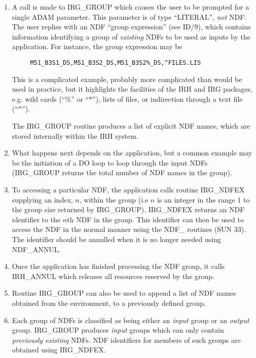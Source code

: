 \begin{enumerate}

\item A call is made to IRG\_GROUP which causes the user to be prompted for a
single ADAM parameter. This parameter is of type ``LITERAL'', {\em not} NDF. The
user replies with an NDF ``group expression'' (see ID/9), which contains
information identifying a group of {\em existing} NDFs to be used as inputs by
the application. For instance, the group expression may be 
\begin{verbatim}
     M51_B3S1_DS,M51_B3S2_DS,M51_B3S2%_DS,^FILES.LIS
\end{verbatim}
This is a complicated example, probably more complicated than would be used in
practice, but it highlights the facilities of the IRH and IRG packages, e.g. wild
cards (``\%'' or ``$*$''), lists of files, or indirection through a text file
(``\verb+^+'').

The IRG\_GROUP routine produces a list of explicit NDF names, which are stored
internally within the IRH system. 

\item What happens next depends on the application, but a common example may be
the initiation of a DO loop to loop through the input NDFs (IRG\_GROUP returns
the total number of NDF names in the group). 

\item To accessing a particular NDF, the application calls routine IRG\_NDFEX
supplying an index, $n$, within the group (i.e $n$ is an integer in the range 1
to the group size returned by IRG\_GROUP). IRG\_NDFEX returns an NDF identifier to
the $n$th NDF in the group. This identifier can then be used to access the NDF
in the normal manner using the NDF\_ routines (SUN 33). The identifier should be
annulled when it is no longer needed using NDF\_ANNUL.

\item Once the application has finished processing the NDF group, it calls 
IRH\_ANNUL which releases all resources reserved by the group.

\item Routine IRG\_GROUP can also be used to append a list of NDF names 
obtained from the environment, to a previously defined group.

\item Each group of NDFs is classified as being either an {\em input} group or 
an {\em output} group. IRG\_GROUP produces {\em input} groups 
which can only contain {\em previously existing} NDFs. NDF identifiers for 
members of such groups are obtained using IRG\_NDFEX.


\end{enumerate}
